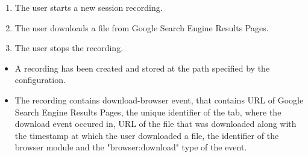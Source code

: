 \begin{tests}
	
	{\begin{enumerate}
		\item The \gls{user} starts a new session recording.
		\item The \gls{user} downloads a file from Google Search Engine Results Pages.
		\item The \gls{user} stops the recording.
	\end{enumerate}}
	{\begin{itemize}
		\item A recording has been created and stored at the path specified by the configuration.
		\item The recording contains download-browser event, that contains URL of Google Search Engine Results Pages, the unique identifier of the tab, where the download event occured in, URL of the file that was downloaded along with the timestamp at which the user downloaded a file, the identifier of the browser module and the "browser:download" type of the event.
	\end{itemize}}
	
\end{tests}
